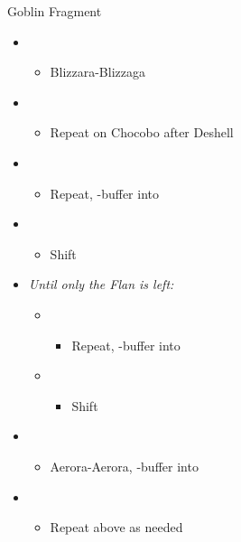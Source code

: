 \begin{battle}{Goblin Fragment}
  \begin{itemize}
    \item \sixth
          \begin{itemize}
            \item Blizzara-Blizzaga
          \end{itemize}
    \item \third
          \begin{itemize}
            \item Repeat on Chocobo after Deshell
          \end{itemize}
    \item \second
          \begin{itemize}
            \item Repeat, \com-buffer into
          \end{itemize}
    \item \first
          \begin{itemize}
            \item Shift
          \end{itemize}
    \item \textit{Until only the Flan is left:}
          \begin{itemize}
            \item \sixth
                  \begin{itemize}
                    \item Repeat, \com-buffer into
                  \end{itemize}
            \item \first
                  \begin{itemize}
                    \item Shift
                  \end{itemize}
          \end{itemize}
    \item \sixth
          \begin{itemize}
            \item Aerora-Aerora, \com-buffer into
          \end{itemize}
    \item \first
          \begin{itemize}
            \item Repeat above as needed
          \end{itemize}
  \end{itemize}
\end{battle}


